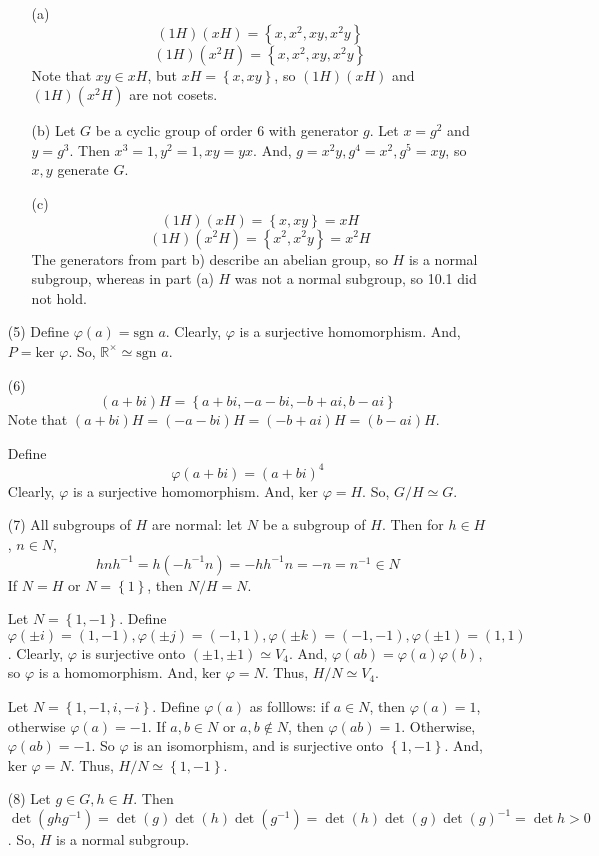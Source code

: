 \begin{itemize}
\begin{itemize}
\item[(a)]
$$(1H)(xH) = \left\lbrace x, x^2, xy, x^2y \right\rbrace$$
$$(1H)(x^2H) = \left\lbrace x, x^2, xy, x^2y \right\rbrace$$
Note that $xy \in xH$, but $xH = \left\lbrace x, xy \right\rbrace$, so $(1H)(xH)$ and $(1H)(x^2H)$ are not cosets.
\item[(b)]
Let $G$ be a cyclic group of order 6 with generator $g$. Let $x = g^2$ and $y = g^3$. Then $x^3 = 1, y^2 = 1, xy = yx$. And, $g = x^2y, g^4 = x^2, g^5 = xy$, so $x, y$ generate $G$.
\item[(c)]
$$(1H)(xH) = \left\lbrace x, xy \right\rbrace = xH$$
$$(1H)(x^2H) = \left\lbrace x^2, x^2y \right\rbrace = x^2H$$
The generators from part b) describe an abelian group, so $H$ is a normal subgroup, whereas in part (a) $H$ was not a normal subgroup, so 10.1 did not hold.
\end{itemize}
\item[(5)]
Define $\varphi(a) = \text{sgn }a$. Clearly, $\varphi$ is a surjective homomorphism. And, $P = \text{ker }\varphi$. So, $\mathbb{R}^\times \simeq \text{sgn }a$.
\item[(6)]
$$(a + bi)H = \left\lbrace a+bi, -a-bi, -b + ai, b - ai \right\rbrace$$
Note that $(a+bi)H = (-a-bi)H = (-b+ai)H = (b-ai)H$.

Define 
$$\varphi(a + bi) = (a+bi)^4$$
Clearly, $\varphi$ is a surjective homomorphism. And, $\text{ker }\varphi = H$. So, $G/H \simeq G$.
\item[(7)]
All subgroups of $H$ are normal: let $N$ be a subgroup of $H$. Then for $h \in H$, $n \in N$,
$$hnh^{-1} = h(-h^{-1}n) = -hh^{-1}n = -n = n^{-1} \in N$$
If $N = H$ or $N = \left\lbrace 1 \right\rbrace$, then $N/H = N$.

Let $N = \left\lbrace 1, -1 \right\rbrace$. Define $\varphi(\pm i) = (1, -1), \varphi(\pm j) = (-1, 1), \varphi(\pm k) = (-1, -1), \varphi(\pm 1) = (1, 1)$. Clearly, $\varphi$ is surjective onto $(\pm 1, \pm 1) \simeq V_4$. And, $\varphi(ab) = \varphi(a)\varphi(b)$, so $\varphi$ is a homomorphism. And, $\text{ker }\varphi = N$. Thus, $H/N \simeq V_4$.

Let $N = \left\lbrace 1, -1, i, -i \right\rbrace$. Define $\varphi(a)$ as folllows: if $a \in N$, then $\varphi(a) = 1$, otherwise $\varphi(a) = -1$. If $a, b \in N$ or $a, b \not \in N$, then $\varphi(ab) = 1$. Otherwise, $\varphi(ab) = -1$. So $\varphi$ is an isomorphism, and is surjective onto $\left\lbrace 1, -1 \right\rbrace$. And, $\text{ker }\varphi = N$. Thus, $H/N \simeq \left\lbrace 1, -1 \right\rbrace$.
\item[(8)]
Let $g \in G, h \in H$. Then $\det(ghg^{-1}) = \det(g)\det(h)\det(g^{-1}) = \det(h)\det(g)\det(g)^{-1} = \det{h} > 0$. So, $H$ is a normal subgroup.


\end{itemize}

